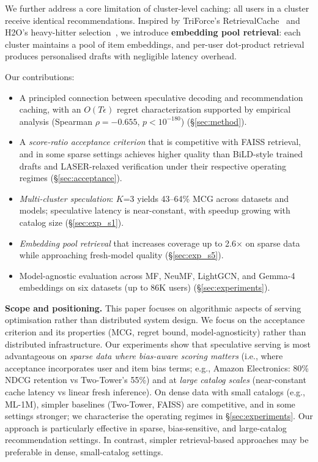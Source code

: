 \documentclass[sigconf,nonacm=false]{acmart}
\begin{document}
We further address a core limitation of cluster-level caching: all users in a cluster receive identical recommendations. Inspired by TriForce's RetrievalCache~\cite{triforce2024} and H2O's heavy-hitter selection~\cite{h2o2023}, we introduce \textbf{embedding pool retrieval}: each cluster maintains a pool of item embeddings, and per-user dot-product retrieval produces personalised drafts with negligible latency overhead.

Our contributions:
\begin{itemize}
    \item A principled connection between speculative decoding and recommendation caching, with an $O(T\epsilon)$ regret characterization supported by empirical analysis (Spearman $\rho=-0.655$, $p<10^{-180}$) (\S\ref{sec:method}).
    \item A \emph{score-ratio acceptance criterion} that is competitive with FAISS retrieval, and in some sparse settings achieves higher quality than BiLD-style trained drafts and LASER-relaxed verification under their respective operating regimes (\S\ref{sec:acceptance}).
    \item \emph{Multi-cluster speculation}: $K$=3 yields 43--64\% MCG across datasets and models; speculative latency is near-constant, with speedup growing with catalog size (\S\ref{sec:exp_s1}).
    \item \emph{Embedding pool retrieval} that increases coverage up to 2.6$\times$ on sparse data while approaching fresh-model quality (\S\ref{sec:exp_s5}).
    \item Model-agnostic evaluation across MF, NeuMF, LightGCN, and Gemma-4 embeddings on six datasets (up to 86K users) (\S\ref{sec:experiments}).
\end{itemize}

\textbf{Scope and positioning.} This paper focuses on algorithmic aspects of serving optimisation rather than distributed system design. We focus on the acceptance criterion and its properties (MCG, regret bound, model-agnosticity) rather than distributed infrastructure. Our experiments show that speculative serving is most advantageous on \emph{sparse data where bias-aware scoring matters} (i.e., where acceptance incorporates user and item bias terms; e.g., Amazon Electronics: 80\% NDCG retention vs Two-Tower's 55\%) and at \emph{large catalog scales} (near-constant cache latency vs linear fresh inference). On dense data with small catalogs (e.g., ML-1M), simpler baselines (Two-Tower, FAISS) are competitive, and in some settings stronger; we characterise the operating regimes in \S\ref{sec:experiments}. Our approach is particularly effective in sparse, bias-sensitive, and large-catalog recommendation settings. In contrast, simpler retrieval-based approaches may be preferable in dense, small-catalog settings.
\end{document}

